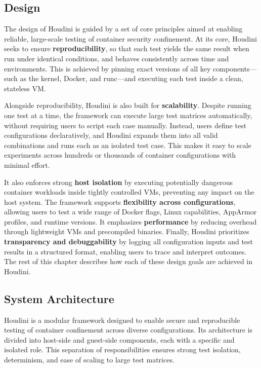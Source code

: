 \documentclass[12pt]{report}
\begin{document}
\begin{doublespace}
\chapter{Design}

The design of Houdini is guided by a set of core principles aimed at enabling reliable, large-scale testing of container security confinement. At its core, Houdini seeks to ensure \textbf{reproducibility}, so that each test yields the same result when run under identical conditions, and behaves consistently across time and environments. This is achieved by pinning exact versions of all key components—such as the kernel, Docker, and runc—and executing each test inside a clean, stateless VM.

Alongside reproducibility, Houdini is also built for \textbf{scalability}. Despite running one test at a time, the framework can execute large test matrices automatically, without requiring users to script each case manually. Instead, users define test configurations declaratively, and Houdini expands them into all valid combinations and runs each as an isolated test case. This makes it easy to scale experiments across hundreds or thousands of container configurations with minimal effort.

It also enforces strong \textbf{host isolation} by executing potentially dangerous container workloads inside tightly controlled VMs, preventing any impact on the host system. The framework supports \textbf{flexibility across configurations}, allowing users to test a wide range of Docker flags, Linux capabilities, AppArmor profiles, and runtime versions. It emphasizes \textbf{performance} by reducing overhead through lightweight VMs and precompiled binaries. Finally, Houdini prioritizes \textbf{transparency and debuggability} by logging all configuration inputs and test results in a structured format, enabling users to trace and interpret outcomes. The rest of this chapter describes how each of these design goals are achieved in Houdini.



\section{System Architecture}
Houdini is a modular framework designed to enable secure and reproducible testing of container confinement across diverse configurations. Its architecture is divided into host-side and guest-side components, each with a specific and isolated role. This separation of responsibilities ensures strong test isolation, determinism, and ease of scaling to large test matrices.


\end{doublespace}
\end{document}
